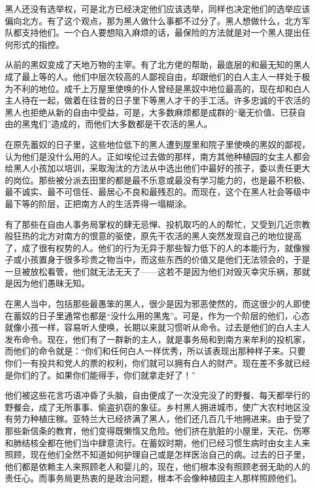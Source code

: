 \par 黑人还没有选举权，可是北方已经决定他们应该选举，同样也决定他们的选举应该偏向北方。有了这个观点，那为黑人做什么事都不过分了。黑人想做什么，北方军队都支持他们。一个白人要想陷入麻烦的话，最保险的方法就是对一个黑人提出任何形式的指控。
\par 从前的黑奴变成了天地万物的主宰。有了北方佬的帮助，最底层的和最无知的黑人成了最上等的人。他们中层次较高的人鄙视自由，却跟他们的白人主人一样处于极为不利的地位。成千上万屋里使唤的仆人曾经是黑奴中地位最高的，现在却和白人主人待在一起，做着在往昔的日子里下等黑人才干的手工活。许多忠诚的干农活的黑人也拒绝从新的自由中受益，可是，大多数麻烦都是成群的“毫无价值、已获自由的黑鬼们”造成的，而他们大多数都是干农活的黑人。
\par 在原先蓄奴的日子里，这些地位低下的黑人遭到屋里和院子里使唤的黑奴的鄙视，认为他们是没什么用的人。正如埃伦过去做的那样，南方其他种植园的女主人都会给黑人小孩加以培训，采取淘汰的方法从中选出他们中最好的孩子，委以责任更大的岗位。那些被分派去田里的都是最不乐意或最没有学习能力的，也是最不积极、最不诚实、最不可信任、最居心不良和最残忍的。而现在，这个在黑人社会等级中最下等的阶层，正把南方人的生活弄得一塌糊涂。
\par 有了那些在自由人事务局掌权的肆无忌惮、投机取巧的人的帮忙，又受到几近宗教般狂热的北方对南方的恨意的驱使，原先干农活的黑人突然发现自己的地位提高了，成了很有权势的人。他们的行为无异于那些智力低下的人的本能行为，就像猴子或小孩置身于很多珍贵之物当中，而这些东西的价值又是他们无法领会的，于是一旦被放松看管，他们就无法无天了——这若不是因为他们对毁灭幸灾乐祸，那就是因为他们愚昧无知。
\par 在黑人当中，包括那些最愚笨的黑人，很少是因为邪恶使然的，而这很少的人即使在蓄奴的日子里通常也都是“没什么用的黑鬼”。可是，作为一个阶层的他们，心态就像小孩一样，容易听人使唤，长期以来就习惯听从命令。过去是他们的白人主人发布命令。现在，他们有了一群新的主人，就是事务局和到南方来牟利的投机家，而他们的命令就是：“你们和任何白人一样优秀，所以该表现出那种样子来。只要你们一有投共和党人的票的权利，你们就可以拥有白人的财产。现在差不多就已经是你们的了。如果你们能得手，你们就拿走好了！”
\par 他们被这些花言巧语冲昏了头脑，自由便成了一次没完没了的野餐、每天都举行的野餐会，成了无所事事、偷盗扒窃的象征。乡村黑人拥进城市，使广大农村地区没有劳力种植庄稼。亚特兰大已经挤满了黑人，他们还几百几千地拥进来。由于受了那些新信条的教育，他们变得既懒惰又危险。他们挤在肮脏的小屋里，天花、伤寒和肺结核全都在他们当中肆意流行。在蓄奴时期，他们已经习惯生病时由女主人来照顾，现在他们全然不知道如何护理自己或是怎样医治自己的病。过去的日子里，他们都是依赖主人来照顾老人和婴儿的，现在，他们根本没有照顾老弱无助的人的责任心。而事务局更热衷的是政治问题，根本不会像种植园主人那样照顾他们。
